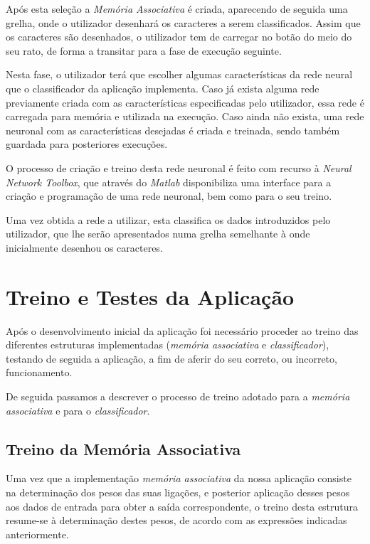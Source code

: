 \documentclass{article}
\begin{document}
Após esta seleção a \emph{Memória Associativa} é criada, aparecendo de seguida uma grelha, onde o utilizador desenhará os caracteres a serem classificados. Assim que os caracteres são desenhados, o utilizador tem de carregar no botão do meio do seu rato, de forma a transitar para a fase de execução seguinte.

Nesta fase, o utilizador terá que escolher algumas características da rede neural que o classificador da aplicação implementa. Caso já exista alguma rede previamente criada com as características especificadas pelo utilizador, essa rede é carregada para memória e utilizada na execução. Caso ainda não exista, uma rede neuronal com as características desejadas é criada e treinada, sendo também guardada para posteriores execuções. 

O processo de criação e treino desta rede neuronal é feito com recurso à \emph{Neural Network Toolbox}, que através do \emph{Matlab} disponibiliza uma interface para a criação e programação de uma rede neuronal, bem como para o seu treino.

Uma vez obtida a rede a utilizar, esta classifica os dados introduzidos pelo utilizador, que lhe serão apresentados numa grelha semelhante à onde inicialmente desenhou os caracteres.


\pagebreak

\section{Treino e Testes da Aplicação}

Após o desenvolvimento inicial da aplicação foi necessário proceder ao treino das diferentes estruturas implementadas (\emph{memória associativa} e \emph{classificador}), testando de seguida a aplicação, a fim de aferir do seu correto, ou incorreto, funcionamento.

De seguida passamos a descrever o processo de treino adotado para a \emph{memória associativa} e para o \emph{classificador}.

\subsection{Treino da Memória Associativa}

Uma vez que a implementação \emph{memória associativa} da nossa aplicação consiste na determinação dos pesos das suas ligações, e posterior aplicação desses pesos aos dados de entrada para obter a saída correspondente, o treino desta estrutura resume-se à determinação destes pesos, de acordo com as expressões indicadas anteriormente.
\end{document}

